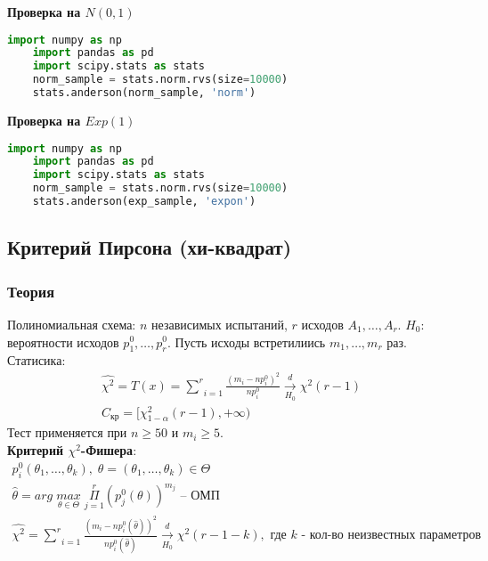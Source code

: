 \textbf{Проверка на $N(0,1)$}

\begin{lstlisting}[language=Python]
	import numpy as np
	import pandas as pd
	import scipy.stats as stats
	norm_sample = stats.norm.rvs(size=10000)
	stats.anderson(norm_sample, 'norm')
\end{lstlisting}

\textbf{Проверка на $Exp(1)$}

\begin{lstlisting}[language=Python]
	import numpy as np
	import pandas as pd
	import scipy.stats as stats
	norm_sample = stats.norm.rvs(size=10000)
	stats.anderson(exp_sample, 'expon')
\end{lstlisting}

\subsection{Критерий Пирсона (хи-квадрат)}\label{cha:compl/sec:nenorm/subsec:pirson}

\subsubsection*{Теория}\label{cha:compl/sec:nenorm/subsec:pirson/subsubsection:theory}

Полиномиальная схема: $n$ независимых испытаний, $r$ исходов $A_1, \dots, A_r$. $H_0:$ вероятности исходов $p_1^0, \dots, p_r^0$. Пусть исходы встретилиись $m_1, \dots, m_r$ раз. Статисика:
$$\begin{gathered}
	\hat{\chi^2} = T(x) = \underset{i=1}{\overset{r}{\sum}}\frac{(m_i - n p_i^0)^2}{n p_i^0} \xrightarrow[H_0]{d}\chi^2 (r-1) \\
	C_{\text{кр}} = [\chi_{1-\alpha}^2 (r-1), +\infty)
\end{gathered}$$
Тест применяется при $n \ge 50$ и $m_i \ge 5$.\\

\textbf{Критерий $\chi^2$-Фишера}:
$$\begin{gathered}
	p_i^0 (\theta_1, \dots, \theta_k), \; \theta = (\theta_1, \dots, \theta_k) \in \Theta \\
	\hat{\theta} = arg \; \underset{\theta \in \Theta}{max} \; \underset{j=1}{\overset{r}{\Pi}} \left( p_j^0 (\theta) \right)^{m_j} \text{ -- ОМП} \\
	\hat{\chi^2} = \underset{i=1}{\overset{r}{\sum}}\frac{\left( m_i - n p_i^0 (\hat{\theta}) \right)^2}{n p_i^0 (\hat{\theta})} \xrightarrow[H_0]{d}\chi^2 (r-1-k), \text{ где } k \text{ - кол-во неизвестных параметров}
\end{gathered}$$

